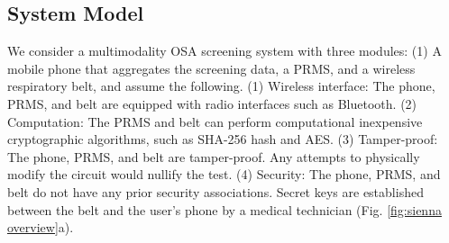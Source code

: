 
\subsection{System Model}
We consider a multimodality OSA screening system with three modules: (1) A mobile phone that aggregates the screening data, a PRMS, and a wireless respiratory belt, and assume the following. (1) Wireless interface: The phone, PRMS, and belt are equipped with radio interfaces such as Bluetooth. (2) Computation: The PRMS and belt can perform computational inexpensive cryptographic algorithms, such as SHA-256 hash and AES. (3) Tamper-proof: The phone, PRMS, and belt are tamper-proof. Any attempts to physically modify the circuit would nullify the test. (4) Security: The phone, PRMS, and belt do not have any prior security associations. Secret keys are established between the belt and the user's phone by a medical technician (Fig. \ref{fig:sienna overview}a).


